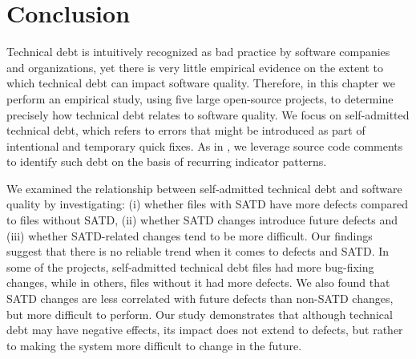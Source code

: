 \section{Conclusion}
\label{chap3:sec:conclusion}



Technical debt is intuitively recognized as bad practice by software companies and organizations, yet there is very little empirical evidence on the extent to which technical debt can impact software quality. Therefore, in this chapter we perform an empirical study, using five large open-source projects, to determine precisely how technical debt relates to software quality. We focus on self-admitted technical debt, which refers to  errors that might be introduced as part of intentional and temporary quick fixes. As in  \cite{ICSM_PotdarS14}, we leverage source code comments to identify such debt on the basis of recurring indicator patterns.


We examined the relationship between self-admitted technical debt and software quality by investigating: (i) whether files with SATD have more defects compared to files without SATD, (ii) whether SATD changes introduce future defects and (iii) whether SATD-related changes tend to be more difficult. Our findings suggest that there is no reliable trend when it comes to defects and SATD. In some of the projects, self-admitted technical debt files had more bug-fixing changes, while in others, files without it had more defects. We also found that SATD changes are less correlated with future defects than non-SATD changes, but more difficult to perform. 
Our study demonstrates that although technical debt may have negative effects, its impact does not extend to defects, but rather to making the system more difficult to change in the future.

